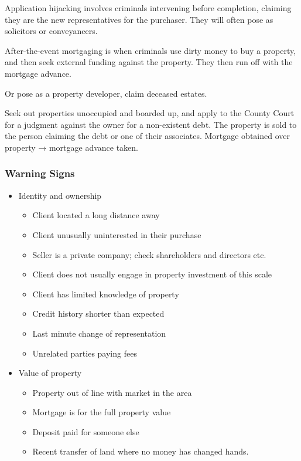 \documentclass[
]{article}
\providecommand{\tightlist}{%
  \setlength{\itemsep}{0pt}\setlength{\parskip}{0pt}}
\begin{document}
Application hijacking involves criminals intervening before completion,
claiming they are the new representatives for the purchaser. They will
often pose as solicitors or conveyancers.

After-the-event mortgaging is when criminals use dirty money to buy a
property, and then seek external funding against the property. They then
run off with the mortgage advance.

Or pose as a property developer, claim deceased estates.

Seek out properties unoccupied and boarded up, and apply to the County
Court for a judgment against the owner for a non-existent debt. The
property is sold to the person claiming the debt or one of their
associates. Mortgage obtained over property → mortgage advance taken.

\hypertarget{warning-signs}{%
\subsubsection{Warning Signs}\label{warning-signs}}

\begin{itemize}
\tightlist
\item
  Identity and ownership

  \begin{itemize}
  \tightlist
  \item
    Client located a long distance away
  \item
    Client unusually uninterested in their purchase
  \item
    Seller is a private company; check shareholders and directors etc.
  \item
    Client does not usually engage in property investment of this scale
  \item
    Client has limited knowledge of property
  \item
    Credit history shorter than expected
  \item
    Last minute change of representation
  \item
    Unrelated parties paying fees
  \end{itemize}
\item
  Value of property

  \begin{itemize}
  \tightlist
  \item
    Property out of line with market in the area
  \item
    Mortgage is for the full property value
  \item
    Deposit paid for someone else
  \item
    Recent transfer of land where no money has changed hands.
  \end{itemize}
\end{itemize}
\end{document}
